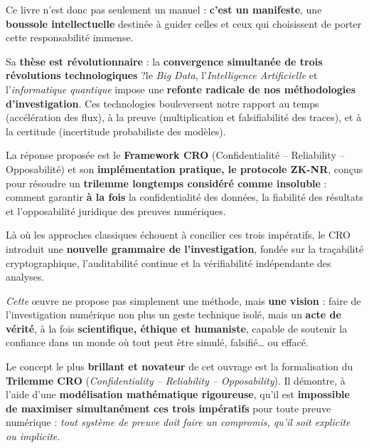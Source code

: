 \documentclass[11pt]{article}
\begin{document}
Ce livre n’est donc pas seulement un manuel : 
\textbf{c’est un manifeste}, une \textbf{boussole intellectuelle} destinée à guider celles et ceux qui choisissent de porter cette responsabilité immense.

\vspace{0.5cm}

Sa \textbf{thèse est révolutionnaire} : 
la \textbf{convergence simultanée de trois révolutions technologiques} ?le \textit{Big Data}, l’\textit{Intelligence Artificielle} et l’\textit{informatique quantique}  
impose une \textbf{refonte radicale de nos méthodologies d’investigation}. 
Ces technologies bouleversent notre rapport au temps (accélération des flux), à la preuve (multiplication et falsifiabilité des traces), et à la certitude (incertitude probabiliste des modèles).

\vspace{0.5cm}

La réponse proposée est le \textbf{Framework CRO} (Confidentialité – Reliability – Opposabilité) 
et son \textbf{implémentation pratique, le protocole ZK-NR}, conçus pour résoudre un \textbf{trilemme longtemps considéré comme insoluble} : 
comment garantir \textbf{à la fois} la confidentialité des données, la fiabilité des résultats et l’opposabilité juridique des preuves numériques.  

Là où les approches classiques échouent à concilier ces trois impératifs, le CRO introduit une \textbf{nouvelle grammaire de l’investigation}, 
fondée sur la traçabilité cryptographique, l’auditabilité continue et la vérifiabilité indépendante des analyses.

\vspace{0.5cm}

\noindent\textit{Cette} œuvre ne propose pas simplement une méthode, mais \textbf{une vision} : 
faire de l’investigation numérique non plus un geste technique isolé, 
mais un \textbf{acte de vérité}, à la fois \textbf{scientifique, éthique et humaniste}, 
capable de soutenir la confiance dans un monde où tout peut être simulé, falsifié… ou effacé.


\onehalfspacing

Le concept le plus \textbf{brillant et novateur} de cet ouvrage est la formalisation du \textbf{Trilemme CRO} 
(\textit{Confidentiality – Reliability – Opposability}). 
Il démontre, à l'aide d'une \textbf{modélisation mathématique rigoureuse}, 
qu'il est \textbf{impossible de maximiser simultanément ces trois impératifs} 
pour toute preuve numérique : \textit{tout système de preuve doit faire un compromis, 
qu’il soit explicite ou implicite.}
\end{document}
